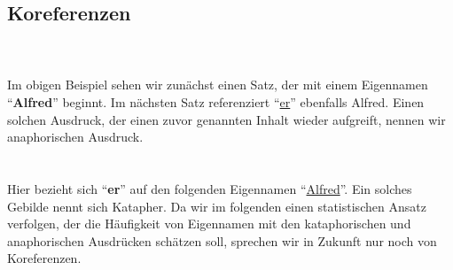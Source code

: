 \subsection{Koreferenzen}
\\
\\
Im obigen Beispiel sehen wir zunächst einen Satz, der mit einem Eigennamen ``\textbf{Alfred}'' beginnt. Im nächsten Satz referenziert ``\underline{er}'' ebenfalls Alfred. Einen solchen Ausdruck, der einen zuvor genannten Inhalt wieder aufgreift, nennen wir anaphorischen Ausdruck.\\
\\
\\
Hier bezieht sich ``\textbf{er}'' auf den folgenden Eigennamen ``\underline{Alfred}''. Ein solches Gebilde nennt sich Katapher. Da wir im folgenden einen statistischen Ansatz verfolgen, der die Häufigkeit von Eigennamen mit den kataphorischen und anaphorischen Ausdrücken schätzen soll, sprechen wir in Zukunft nur noch von Koreferenzen.
